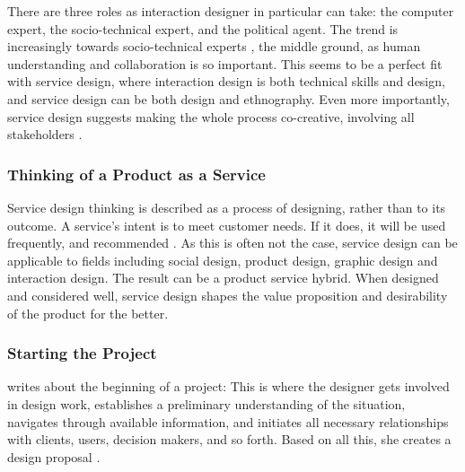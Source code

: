 There are three roles as interaction designer in particular can take: the computer expert, the socio-technical expert, and the political agent. The trend is increasingly towards socio-technical experts \citep{lowgren}, the middle ground, as human understanding and collaboration is so important. This seems to be a perfect fit with service design, where interaction design is both technical skills and design, and service design can be both design and ethnography. Even more importantly, service design suggests making the whole process co-creative, involving all stakeholders \citep{stickdorn}.

\subsubsection{Thinking of a Product as a Service}

Service design thinking is described as a process of designing, rather than to its outcome. A service's intent is to meet customer needs. If it does, it will be used frequently, and recommended \citep{stickdorn}. As this is often not the case, service design can be applicable to fields including social design, product design, graphic design and interaction design. The result can be a product service hybrid. When designed and considered well, service design shapes the value proposition and desirability of the product for the better.

\subsubsection{Starting the Project}

\cite{lowgren} writes about the beginning of a project: This is where the designer gets involved in design work, establishes a preliminary understanding of the situation, navigates through available information, and initiates all necessary relationships with clients, users, decision makers, and so forth. Based on all this, she creates a design proposal \citep{lowgren}.
